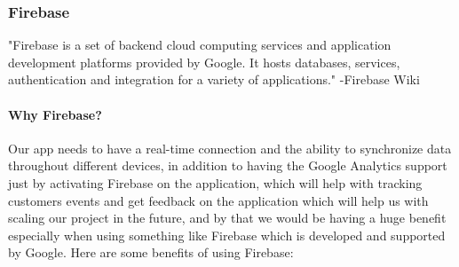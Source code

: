 \documentclass[a4paper, 12pt]{report} %
\begin{document}
            \subsubsection{Firebase}
                "Firebase is a set of backend cloud computing services and application development platforms provided by Google. It hosts databases, services, authentication and integration for a variety of applications." -Firebase Wiki \cite{firebase_wiki}
                
                \paragraph{Why Firebase?} 
                
                Our app needs to have a real-time connection and the ability to synchronize data throughout different devices, in addition to having the Google Analytics support just by activating Firebase on the application, which will help with tracking customers events and get feedback on the application which will help us with scaling our project in the future, and by that we would be having a  huge benefit especially when using something like Firebase which is developed and supported by Google. Here are some benefits of using Firebase:
                
\end{document}
